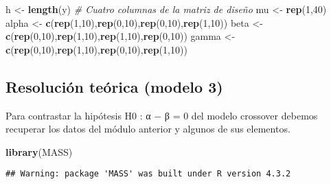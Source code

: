 \documentclass[
]{article}
\newenvironment{Shaded}{\begin{snugshade}}{\end{snugshade}}
\newcommand{\CommentTok}[1]{\textcolor[rgb]{0.56,0.35,0.01}{\textit{#1}}}
\newcommand{\DecValTok}[1]{\textcolor[rgb]{0.00,0.00,0.81}{#1}}
\newcommand{\FunctionTok}[1]{\textcolor[rgb]{0.13,0.29,0.53}{\textbf{#1}}}
\newcommand{\NormalTok}[1]{#1}
\newcommand{\OtherTok}[1]{\textcolor[rgb]{0.56,0.35,0.01}{#1}}
\begin{document}
\begin{Shaded}
\begin{Highlighting}[]
\NormalTok{h }\OtherTok{\textless{}{-}} \FunctionTok{length}\NormalTok{(y)}
\CommentTok{\# Cuatro columnas de la matriz de diseño}
\NormalTok{mu }\OtherTok{\textless{}{-}} \FunctionTok{rep}\NormalTok{(}\DecValTok{1}\NormalTok{,}\DecValTok{40}\NormalTok{)}
\NormalTok{alpha }\OtherTok{\textless{}{-}} \FunctionTok{c}\NormalTok{(}\FunctionTok{rep}\NormalTok{(}\DecValTok{1}\NormalTok{,}\DecValTok{10}\NormalTok{),}\FunctionTok{rep}\NormalTok{(}\DecValTok{0}\NormalTok{,}\DecValTok{10}\NormalTok{),}\FunctionTok{rep}\NormalTok{(}\DecValTok{0}\NormalTok{,}\DecValTok{10}\NormalTok{),}\FunctionTok{rep}\NormalTok{(}\DecValTok{1}\NormalTok{,}\DecValTok{10}\NormalTok{))}
\NormalTok{beta }\OtherTok{\textless{}{-}} \FunctionTok{c}\NormalTok{(}\FunctionTok{rep}\NormalTok{(}\DecValTok{0}\NormalTok{,}\DecValTok{10}\NormalTok{),}\FunctionTok{rep}\NormalTok{(}\DecValTok{1}\NormalTok{,}\DecValTok{10}\NormalTok{),}\FunctionTok{rep}\NormalTok{(}\DecValTok{1}\NormalTok{,}\DecValTok{10}\NormalTok{),}\FunctionTok{rep}\NormalTok{(}\DecValTok{0}\NormalTok{,}\DecValTok{10}\NormalTok{))}
\NormalTok{gamma }\OtherTok{\textless{}{-}} \FunctionTok{c}\NormalTok{(}\FunctionTok{rep}\NormalTok{(}\DecValTok{0}\NormalTok{,}\DecValTok{10}\NormalTok{),}\FunctionTok{rep}\NormalTok{(}\DecValTok{1}\NormalTok{,}\DecValTok{10}\NormalTok{),}\FunctionTok{rep}\NormalTok{(}\DecValTok{0}\NormalTok{,}\DecValTok{10}\NormalTok{),}\FunctionTok{rep}\NormalTok{(}\DecValTok{1}\NormalTok{,}\DecValTok{10}\NormalTok{))}
\end{Highlighting}
\end{Shaded}

\hypertarget{resoluciuxf3n-teuxf3rica-modelo-3}{%
\subsection{Resolución teórica (modelo
3)}\label{resoluciuxf3n-teuxf3rica-modelo-3}}

Para contrastar la hipótesis H0 : α − β = 0 del modelo crossover debemos
recuperar los datos del módulo anterior y algunos de sus elementos.

\begin{Shaded}
\begin{Highlighting}[]
\FunctionTok{library}\NormalTok{(MASS)}
\end{Highlighting}
\end{Shaded}

\begin{verbatim}
## Warning: package 'MASS' was built under R version 4.3.2
\end{verbatim}
\end{document}
